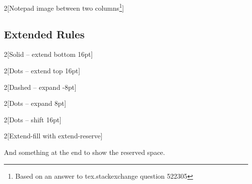 \documentclass{article}
\begin{document}
\setlength{\columnsep}{2in}

\begin{multicols}{2}[Notepad image between two columns\footnote{Based on an answer to tex.stackexchange question 522305}]
  \lipsum[1-2]
\end{multicols}

\subsection*{Extended Rules}
\setlength{\columnsep}{24pt}

\begin{multicols}{2}[Solid -- extend bottom 16pt]
  \lipsum[1]
\end{multicols}

\begin{multicols}{2}[Dots -- extend top 16pt]
  \lipsum[1]
\end{multicols}

\begin{multicols}{2}[Dashed -- expand -8pt]
  \lipsum[1]
\end{multicols}

\begin{multicols}{2}[Dots -- expand 8pt]
  \lipsum[1]
\end{multicols}

\begin{multicols}{2}[Dots -- shift 16pt]
  \lipsum[1-2]
\end{multicols}

\begin{multicols}{2}[Extend-fill with extend-reserve]
  \lipsum[1-2]
\end{multicols}
And something at the end to show the reserved space.
\end{document}
